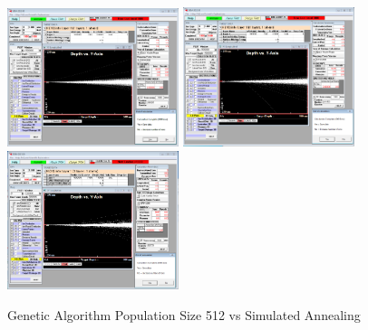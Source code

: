 \begin{figure}[!ht]
  \begin{center}
    \includegraphics[width=5.0cm]{appendix/srim_data/24MeV.png}
    \includegraphics[width=5.0cm]{appendix/srim_data/26MeV.png}
    \includegraphics[width=5.0cm]{appendix/srim_data/28MeV.png}
    \caption{Genetic Algorithm Population Size 512 vs Simulated Annealing}
    \label{fig:ga_vs_sim_512_3}
  \end{center}
\end{figure}

